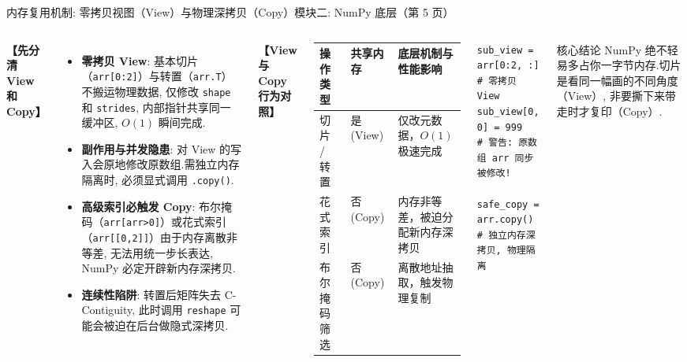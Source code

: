 \documentclass[aspectratio=169,9pt]{beamer}
\begin{document}
\begin{frame}[fragile]{内存复用机制: 零拷贝视图（View）与物理深拷贝（Copy）}{模块二: NumPy 底层（第 5 页）}
\begin{columns}[T]
    \textbf{【先分清 View 和 Copy】}
    \begin{itemize}
        \item \textbf{零拷贝 View}: 基本切片（\texttt{arr[0:2]}）与转置（\texttt{arr.T}）不搬运物理数据, 仅修改 \texttt{shape} 和 \texttt{strides}, 内部指针共享同一缓冲区, $O(1)$ 瞬间完成.
        \item \textbf{副作用与并发隐患}: 对 View 的写入会原地修改原数组.需独立内存隔离时, 必须显式调用 \texttt{.copy()}.
        \item \textbf{高级索引必触发 Copy}: 布尔掩码（\texttt{arr[arr>0]}）或花式索引（\texttt{arr[[0,2]]}）由于内存离散非等差, 无法用统一步长表达, NumPy 必定开辟新内存深拷贝.
        \item \textbf{连续性陷阱}: 转置后矩阵失去 C-Contiguity, 此时调用 \texttt{reshape} 可能会被迫在后台做隐式深拷贝.
    \end{itemize}

    \textbf{【View 与 Copy 行为对照】}
    \vspace{1.5mm}

    {\scriptsize
    \setlength{\tabcolsep}{3pt}       %
    \renewcommand{\arraystretch}{1.2} %
    \begin{tabular}{@{}p{1.5cm}p{1.1cm}p{3.0cm}@{}}
        \toprule
        \textbf{操作类型} & \textbf{共享内存} & \textbf{底层机制与性能影响} \\
        \midrule
        切片 / 转置   & 是 (View) & 仅改元数据，$O(1)$ 极速完成 \\
        花式索引      & 否 (Copy) & 内存非等差，被迫分配新内存深拷贝 \\
        布尔掩码筛选  & 否 (Copy) & 离散地址抽取，触发物理复制 \\
        \bottomrule
    \end{tabular}
    }
    \vspace{2mm}
\begin{lstlisting}
sub_view = arr[0:2, :]  # 零拷贝 View
sub_view[0, 0] = 999     # 警告: 原数组 arr 同步被修改!

safe_copy = arr.copy()   # 独立内存深拷贝, 物理隔离
\end{lstlisting}
    \begin{alertblock}{核心结论}
        \scriptsize NumPy 绝不轻易多占你一字节内存.切片是看同一幅画的不同角度（View）, 非要撕下来带走时才复印（Copy）.
    \end{alertblock}
\end{columns}
\end{frame}
\end{document}

